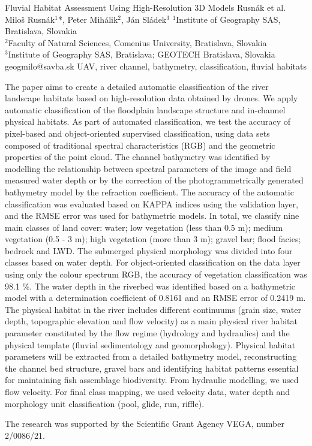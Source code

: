 \abstract
{Fluvial Habitat Assessment Using High-Resolution 3D Models} %
{Rusnák et al.} %
{Miloš Rusnák$^1$*, Peter Mihálik$^2$, Ján Sládek$^3$} %
{\KLtag} %
{
	$^1$Institute of Geography SAS, Bratislava, Slovakia\\
	$^2$Faculty of Natural Sciences, Comenius University, Bratislava, Slovakia\\
	$^3$Institute of Geography SAS, Bratislava; GEOTECH Bratislava, Slovakia\\
} %
{geogmilo@savba.sk}  %
{UAV, river channel, bathymetry, classification, fluvial habitats}%
{The paper aims to create a detailed automatic classification of the river landscape habitats based on high-resolution data obtained by drones. We apply automatic classification of the floodplain landscape structure and in-channel physical habitats. As part of automated classification, we test the accuracy of pixel-based and object-oriented supervised classification, using data sets composed of traditional spectral characteristics (RGB) and the geometric properties of the point cloud. The channel bathymetry was identified by modelling the relationship between spectral parameters of the image and field measured water depth or by the correction of the photogrammetrically generated bathymetry model by the refraction coefficient. The accuracy of the automatic classification was evaluated based on KAPPA indices using the validation layer, and the RMSE error was used for bathymetric models. In total, we classify nine main classes of land cover: water; low vegetation (less than 0.5 m); medium vegetation (0.5 - 3 m); high vegetation (more than 3 m); gravel bar; flood facies; bedrock and LWD. The submerged physical morphology was divided into four classes based on water depth. For object-oriented classification on the data layer using only the colour spectrum RGB, the accuracy of vegetation classification was 98.1 \%. The water depth in the riverbed was identified based on a bathymetric model with a determination coefficient of 0.8161 and an RMSE error of 0.2419 m. The physical habitat in the river includes different continuums (grain size, water depth, topographic elevation and flow velocity) as a main physical river habitat parameter constituted by the flow regime (hydrology and hydraulics) and the physical template (fluvial sedimentology and geomorphology). Physical habitat parameters will be extracted from a detailed bathymetry model, reconstructing the channel bed structure, gravel bars and identifying habitat patterns essential for maintaining fish assemblage biodiversity. From hydraulic modelling, we used flow velocity. For final class mapping, we used velocity data, water depth and morphology unit classification (pool, glide, run, riffle).
	
	The research was supported by the Scientific Grant Agency VEGA, number 2/0086/21.
}%
{}%

